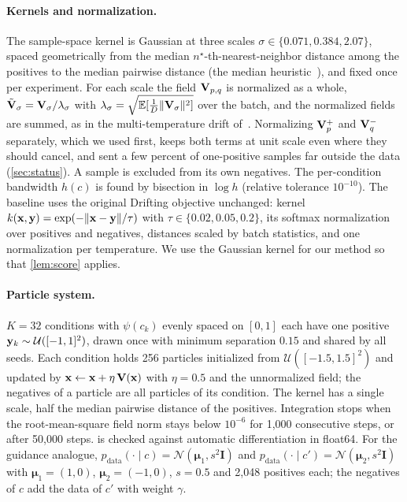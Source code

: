 \paragraph{Kernels and normalization.} The sample-space kernel is Gaussian at three scales
$\sigma\in\{0.071,0.384,2.07\}$, spaced geometrically from the median $n^\star$-th-nearest-neighbor distance among the
positives to the median pairwise distance (the median heuristic~\cite{gretton2012kernel}), and fixed once per
experiment. For each scale the field $\mathbf{V}_{p,q}$ is normalized as a whole, $\tilde{\mathbf{V}}_\sigma=\mathbf{V}_\sigma/\lambda_\sigma$
with $\lambda_\sigma=\sqrt{\mathbb E[\tfrac1D\lVert\mathbf{V}_\sigma\rVert^2]}$ over the batch, and the normalized fields are
summed, as in the multi-temperature drift of~\cite{deng2026drifting}. Normalizing $\mathbf{V}^{+}_{p}$ and $\mathbf{V}^{-}_{q}$ separately, which we
used first, keeps both terms at unit scale even where they should cancel, and sent a few percent of one-positive
samples far outside the data (\cref{sec:status}). A sample is excluded from its own negatives. The per-condition
bandwidth $h(c)$ is found by bisection in $\log h$ (relative tolerance $10^{-10}$). The baseline uses the original
Drifting objective unchanged: kernel $k(\mathbf{x},\mathbf{y})=\exp(-\lVert\mathbf{x}-\mathbf{y}\rVert/\tau)$ with $\tau\in\{0.02,0.05,0.2\}$, its
softmax normalization over positives and negatives, distances scaled by batch statistics, and one normalization per
temperature. We use the Gaussian kernel for our method so that \cref{lem:score} applies.

\paragraph{Particle system.} $K=32$ conditions with $\psi(c_k)$ evenly spaced on $[0,1]$ each have one positive
$\mathbf{y}_k\sim\mathcal U([-1,1]^2)$, drawn once with minimum separation $0.15$ and shared by all seeds. Each condition holds
256 particles initialized from $\mathcal U([-1.5,1.5]^2)$ and updated by $\mathbf{x}\leftarrow\mathbf{x}+\eta\,\mathbf{V}(\mathbf{x})$ with $\eta=0.5$
and the unnormalized field; the negatives of a particle are all particles of its condition. The kernel has a single
scale, half the median pairwise distance of the positives. Integration stops when the root-mean-square field norm stays
below $10^{-6}$ for 1{,}000 consecutive steps, or after 50{,}000 steps.  is checked against automatic
differentiation in float64. For the guidance analogue, $p_\mathrm{data}(\cdot\mid c)=\mathcal N(\boldsymbol\mu_1,s^2\mathbf I)$
and $p_\mathrm{data}(\cdot\mid c')=\mathcal N(\boldsymbol\mu_2,s^2\mathbf I)$ with $\boldsymbol\mu_1=(1,0)$,
$\boldsymbol\mu_2=(-1,0)$, $s=0.5$ and 2{,}048 positives each; the negatives of $c$ add the data of $c'$ with weight
$\gamma$.

